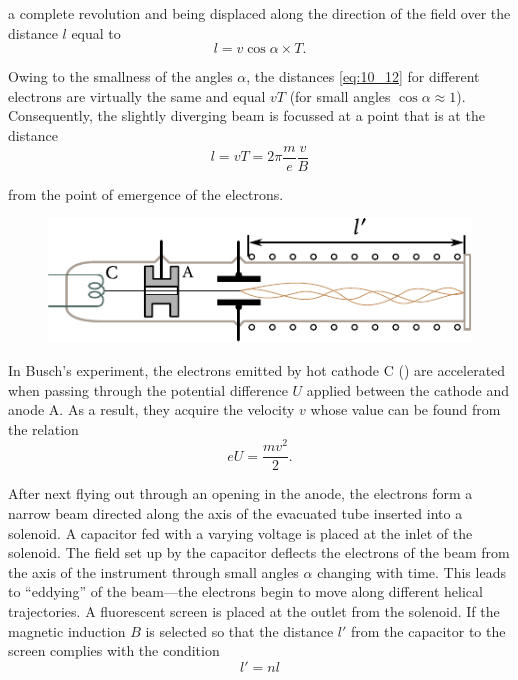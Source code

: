 \noindent
a complete revolution and being displaced along the direction of the field over the distance $l$ equal to
\begin{equation}\label{eq:10_12}
    l = v\cos\alpha \times T.
\end{equation}

\noindent
Owing to the smallness of the angles $\alpha$, the distances \eqref{eq:10_12} for different electrons are virtually the same and equal $vT$ (for small angles $\cos\alpha\approx 1$).
Consequently, the slightly diverging beam is focussed at a point that is at the distance
\begin{equation}\label{eq:10_13}
    l = vT = 2 \pi \frac{m}{e} \frac{v}{B}
\end{equation}

\noindent
from the point of emergence of the electrons.

\begin{figure}[t]
	\begin{center}
		\includegraphics[scale=1]{figures/ch_10/fig_10_7.pdf}
		\caption[]{}
		\label{fig:10_7}
	\end{center}
	\vspace{-0.8cm}
\end{figure}

In Busch's experiment, the electrons emitted by hot cathode C () are accelerated when passing through the potential difference $U$ applied between the cathode and anode A.
As a result, they acquire the velocity $v$ whose value can be found from the relation
\begin{equation}\label{eq:10_14}
    eU = \frac{mv^2}{2}.
\end{equation}

\noindent
After next flying out through an opening in the anode, the electrons form a narrow beam directed along the axis of the evacuated tube inserted into a solenoid.
A capacitor fed with a varying voltage is placed at the inlet of the solenoid.
The field set up by the capacitor deflects the electrons of the beam from the axis of the instrument
through small angles $\alpha$ changing with time.
This leads to ``eddying'' of the beam---the electrons begin to move along different helical trajectories.
A fluorescent screen is placed at the outlet from the solenoid.
If the magnetic induction $B$ is selected so that the distance $l'$ from the capacitor to the screen complies with the condition
\begin{equation}\label{eq:10_15}
    l' = n l
\end{equation}

